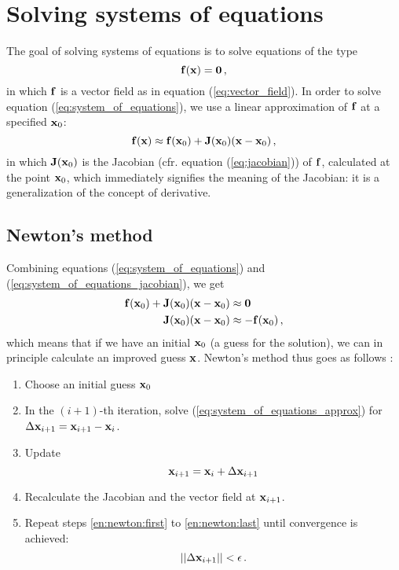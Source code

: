 \section{Solving systems of equations}
    The goal of solving systems of equations is to solve equations of the type
    \begin{equation} \label{eq:system_of_equations}
        \vb{f}(\vb{x}) = \vb{0} \thinspace ,
    \end{equation}
    in which $\vb{f}$ is a vector field as in equation (\ref{eq:vector_field}). In order to solve equation (\ref{eq:system_of_equations}), we use a linear approximation of $\vb{f}$ at a specified $\vb{x}_0$:
    \begin{equation} \label{eq:system_of_equations_jacobian}
        \vb{f}(\vb{x}) \approx \vb{f}(\vb{x}_0) + \vb{J}(\vb{x}_0) (\vb{x} - \vb{x}_0) \thinspace ,
    \end{equation}
    in which $\vb{J}(\vb{x}_0)$ is the Jacobian (cfr. equation (\ref{eq:jacobian})) of $\vb{f}$, calculated at the point $\vb{x}_0$, which immediately signifies the meaning of the Jacobian: it is a generalization of the concept of derivative.

    \subsection{Newton's method}
        Combining equations (\ref{eq:system_of_equations}) and (\ref{eq:system_of_equations_jacobian}), we get
        \begin{align}
            \vb{f}(\vb{x}_0) + \vb{J}(\vb{x}_0) (\vb{x} - \vb{x}_0) &\approx \vb{0} \\
            \vb{J}(\vb{x}_0) (\vb{x} - \vb{x}_0) & \approx - \vb{f}(\vb{x}_0) \label{eq:system_of_equations_approx} \thinspace ,
        \end{align}
        which means that if we have an initial $\vb{x}_0$ (a guess for the solution), we can in principle calculate an improved guess $\vb{x}$. Newton's method thus goes as follows \cite{Burden2011}:
        \begin{enumerate}
            \item Choose an initial guess $\vb{x}_0$
            \item \label{en:newton:first} In the $(i+1)$-th iteration, solve (\ref{eq:system_of_equations_approx}) for $\Delta \vb{x}_{i+1} = \vb{x}_{i+1} - \vb{x}_i$.
            \item Update
                \begin{equation}
                    \vb{x}_{i+1} = \vb{x}_i + \Delta \vb{x}_{i+1}
                \end{equation}
            \item \label{en:newton:last} Recalculate the Jacobian and the vector field at $\vb{x}_{i+1}$.
            \item Repeat steps \ref{en:newton:first} to \ref{en:newton:last} until convergence is achieved:
                \begin{equation}
                    || \Delta \vb{x}_{i+1} || < \epsilon \thinspace .
                \end{equation}
        \end{enumerate}

